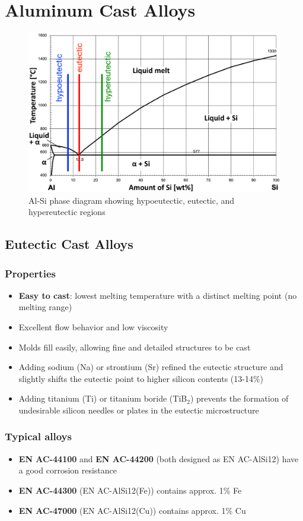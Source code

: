 \documentclass{article}
\begin{document}
\section{Aluminum Cast Alloys}
\begin{figure}[ht!]
  \centering
  \includegraphics[width=.9\textwidth]{media/T-Si_diagram.png}
  \caption*{Al-Si phase diagram showing hypoeutectic, eutectic, and hypereutectic regions}
\end{figure}

\newpage
\subsection{Eutectic Cast Alloys}
\subsubsection{Properties}
\begin{itemize}
  \item \textbf{Easy to cast}: lowest melting temperature with a distinct melting point (no melting range)
  \item Excellent flow behavior and low viscosity
  \item Molds fill easily, allowing fine and detailed structures to be cast
  \item Adding sodium (Na) or strontium (Sr) refined the eutectic structure and slightly shifts the eutectic point to higher silicon contents (13-14\%)
  \item Adding titanium (Ti) or titanium boride (TiB$_2$) prevents the formation of undesirable silicon needles or plates in the eutectic microstructure
\end{itemize}

\subsubsection{Typical alloys}
\begin{itemize}
  \item \textbf{EN AC-44100} and \textbf{EN AC-44200} (both designed as EN AC-AlSi12) have a good corrosion resistance
  \item \textbf{EN AC-44300} (EN AC-AlSi12(Fe)) contains approx. 1\% Fe
  \item \textbf{EN AC-47000} (EN AC-AlSi12(Cu)) contains approx. 1\% Cu
\end{itemize}
\end{document}
